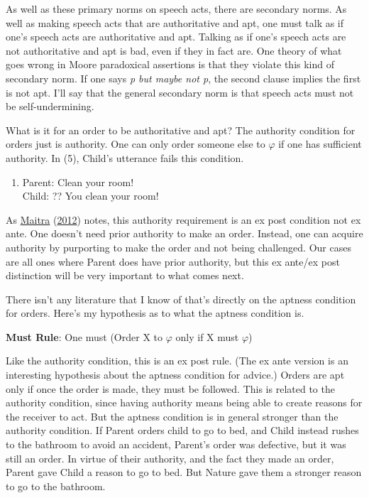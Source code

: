 \documentclass[
  12pt,
]{article}
\providecommand{\tightlist}{%
  \setlength{\itemsep}{0pt}\setlength{\parskip}{0pt}}
\begin{document}
As well as these primary norms on speech acts, there are secondary
norms. As well as making speech acts that are authoritative and apt, one
must talk as if one's speech acts are authoritative and apt. Talking as
if one's speech acts are not authoritative and apt is bad, even if they
in fact are. One theory of what goes wrong in Moore paradoxical
assertions is that they violate this kind of secondary norm. If one says
\emph{p but maybe not p}, the second clause implies the first is not
apt. I'll say that the general secondary norm is that speech acts must
not be self-undermining.

What is it for an order to be authoritative and apt? The authority
condition for orders just is authority. One can only order someone else
to \(\varphi\) if one has sufficient authority. In (5), Child's
utterance fails this condition.

\begin{enumerate}
\def\labelenumi{(\arabic{enumi})}
\setcounter{enumi}{4}
\tightlist
\item
  Parent: Clean your room!\\
  Child: ?? You clean your room!
\end{enumerate}

As \protect\hyperlink{ref-Maitra2012}{Maitra}
(\protect\hyperlink{ref-Maitra2012}{2012}) notes, this authority
requirement is an ex post condition not ex ante. One doesn't need prior
authority to make an order. Instead, one can acquire authority by
purporting to make the order and not being challenged. Our cases are all
ones where Parent does have prior authority, but this ex ante/ex post
distinction will be very important to what comes next.

There isn't any literature that I know of that's directly on the aptness
condition for orders. Here's my hypothesis as to what the aptness
condition is.

\textbf{Must Rule}: One must (Order X to \(\varphi\) only if X must
\(\varphi\))

Like the authority condition, this is an ex post rule. (The ex ante
version is an interesting hypothesis about the aptness condition for
advice.) Orders are apt only if once the order is made, they must be
followed. This is related to the authority condition, since having
authority means being able to create reasons for the receiver to act.
But the aptness condition is in general stronger than the authority
condition. If Parent orders child to go to bed, and Child instead rushes
to the bathroom to avoid an accident, Parent's order was defective, but
it was still an order. In virtue of their authority, and the fact they
made an order, Parent gave Child a reason to go to bed. But Nature gave
them a stronger reason to go to the bathroom.
\end{document}
